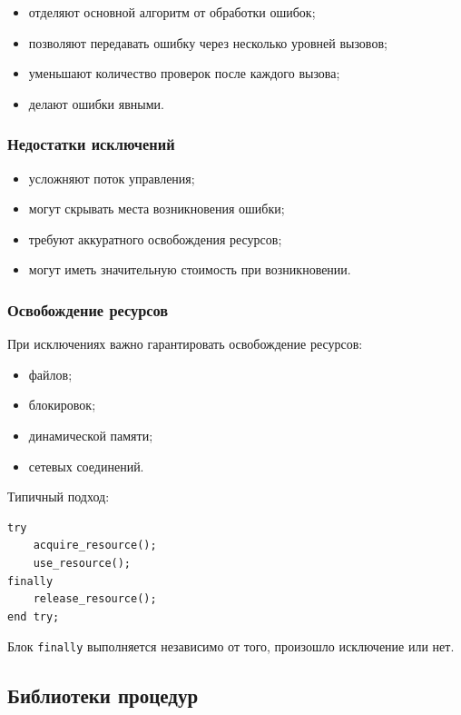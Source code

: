 \documentclass[12pt,a4paper]{article}
\begin{document}
\begin{itemize}
    \item отделяют основной алгоритм от обработки ошибок;
    \item позволяют передавать ошибку через несколько уровней вызовов;
    \item уменьшают количество проверок после каждого вызова;
    \item делают ошибки явными.
\end{itemize}

\subsubsection{Недостатки исключений}

\begin{itemize}
    \item усложняют поток управления;
    \item могут скрывать места возникновения ошибки;
    \item требуют аккуратного освобождения ресурсов;
    \item могут иметь значительную стоимость при возникновении.
\end{itemize}

\subsubsection{Освобождение ресурсов}

При исключениях важно гарантировать освобождение ресурсов:
\begin{itemize}
    \item файлов;
    \item блокировок;
    \item динамической памяти;
    \item сетевых соединений.
\end{itemize}

Типичный подход:

\begin{verbatim}
try
    acquire_resource();
    use_resource();
finally
    release_resource();
end try;
\end{verbatim}

Блок \texttt{finally} выполняется независимо от того, произошло исключение или нет.

\subsection{Библиотеки процедур}
\end{document}
